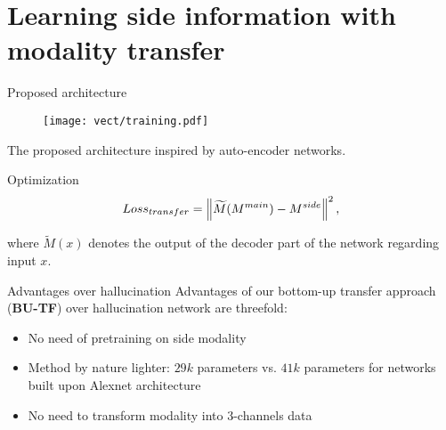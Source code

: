 \section{Learning side information with modality transfer}

\label{subsec:modality}

\begin{frame}{Proposed architecture}
	\vfill
	\begin{figure}
			\centering
			\texttt{[image: vect/training.pdf]}			
			\uncover<2>{\texttt{[image: vect/testing.pdf]}}
		\end{figure}
	\vfill
	The proposed architecture inspired by auto-encoder networks.
	\vfill
\end{frame}

\begin{frame}{Optimization}
	\begin{equation}
			Loss_{transfer} = \left\lVert\widetilde{M}(M^{main}) - M^{side}\right\rVert^2,
	\end{equation}
	
	where $\widetilde{M}(x)$ denotes the output of the decoder part of the network regarding input $x$.
	
	
	
\end{frame}

\begin{frame}{Advantages over hallucination}
	Advantages of our bottom-up transfer approach (\textbf{BU-TF}) over hallucination network are threefold: 
	\begin{itemize}
		\item<2-> No need of pretraining on side modality
		\item<3-> Method by nature lighter: $29k$ parameters vs. $41k$ parameters for networks built upon Alexnet architecture
		\item<4> No need to transform modality into 3-channels data
	\end{itemize}
	

\end{frame}